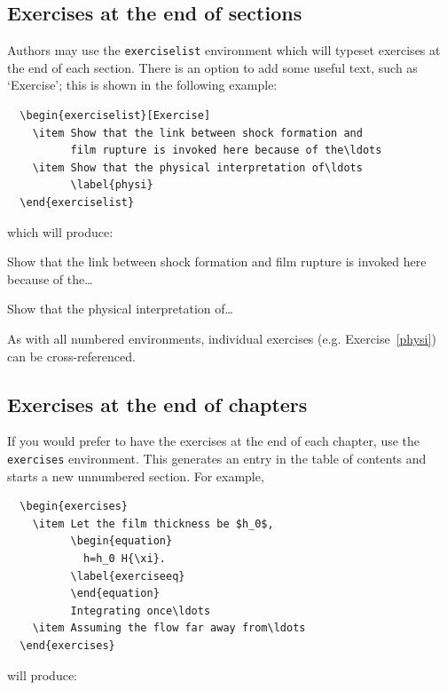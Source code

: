 \subsection{Exercises at the end of sections}
\label{exendofsections}

Authors may use the \verb"exerciselist" environment which will typeset exercises at the end of each section. There is an option to add some useful text, such as `Exercise'; this is shown in the following example:
\begin{verbatim}
  \begin{exerciselist}[Exercise]
    \item Show that the link between shock formation and
          film rupture is invoked here because of the\ldots
    \item Show that the physical interpretation of\ldots
          \label{physi}
  \end{exerciselist}
\end{verbatim}
which will produce:
  \begin{exerciselist}[Exercise]
    \item Show that the link between shock formation and
          film rupture is invoked here because of the\ldots
    \item Show that the physical interpretation of\ldots
          \label{physi}
  \end{exerciselist}
As with all numbered environments, individual exercises (e.g. Exercise~\ref{physi}) can be cross-referenced.

\subsection{Exercises at the end of chapters}

If you would prefer to have the exercises at the end of each chapter, use the \verb"exercises" environment. This generates an entry in the table of contents and starts a new unnumbered section. For example,
\begin{verbatim}
  \begin{exercises}
    \item Let the film thickness be $h_0$,
          \begin{equation}
            h=h_0 H{\xi}.
          \label{exerciseeq}
          \end{equation}
          Integrating once\ldots
    \item Assuming the flow far away from\ldots
  \end{exercises}
\end{verbatim}
will produce:


